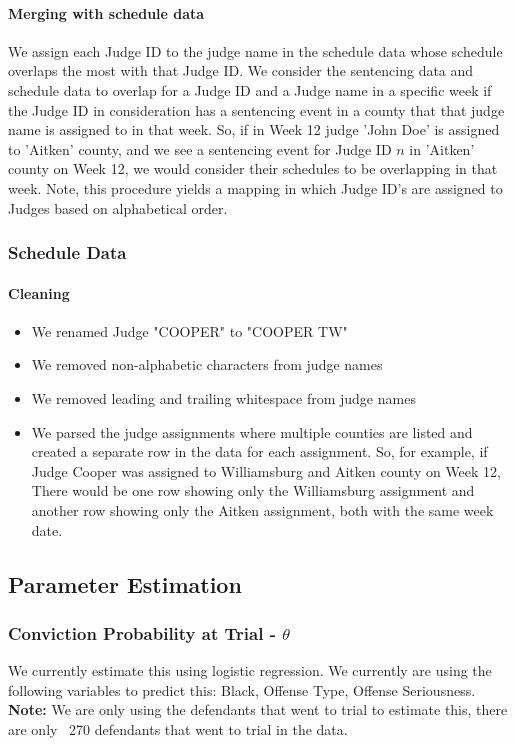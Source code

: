 \documentclass[11pt]{article}
\begin{document}
      \paragraph{Merging with schedule data}
        We assign each Judge ID to the judge name in the schedule data whose schedule
        overlaps the most with that Judge ID. We consider the sentencing data and schedule
        data to overlap for a Judge ID and a Judge name in a specific week
        if the Judge ID in consideration has a sentencing event in a county that
        that judge name is assigned to in that week. So, if in Week 12 judge 'John Doe'
        is assigned to 'Aitken' county, and we see a sentencing event for Judge ID $n$
        in 'Aitken' county on Week 12, we would consider their schedules to be overlapping in
        that week. Note, this procedure yields a mapping in which Judge ID's are assigned to
        Judges based on alphabetical order.

    \subsubsection{Schedule Data}
      \paragraph{Cleaning}
        \begin{itemize}
          \item We renamed Judge "COOPER" to "COOPER TW"
          \item We removed non-alphabetic characters from judge names
          \item We removed leading and trailing whitespace from judge names
          \item We parsed the judge assignments where multiple counties are listed
          and created a separate row in the data for each assignment. So, for example,
          if Judge Cooper was assigned to Williamsburg and Aitken county on Week 12,
          There would be one row showing only the Williamsburg assignment and another row
          showing only the Aitken assignment, both with the same week date.
        \end{itemize}

  \subsection{Parameter Estimation}
    \subsubsection{Conviction Probability at Trial - $\theta$}
      We currently estimate this using logistic regression. We currently are using the
      following variables to predict this: Black, Offense Type, Offense Seriousness. \textbf{Note:} We are only using the defendants that went to trial to estimate this, there are only ~270 defendants that went to trial in the data.
\end{document}
